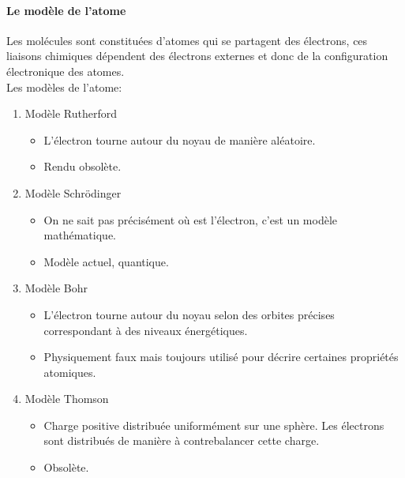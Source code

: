 \documentclass[10pt,a4paper]{book}
\begin{document}
\paragraph{Le modèle de l'atome}
Les molécules sont constituées d'atomes qui se partagent des électrons, ces liaisons chimiques dépendent des électrons externes et donc de la configuration électronique des atomes. \\
Les modèles de l'atome:
\begin{enumerate}
\item Modèle Rutherford
\begin{itemize}
\item L'électron tourne autour du noyau de manière aléatoire.
\item Rendu obsolète.
\end{itemize}
\item Modèle Schrödinger
\begin{itemize}
\item On ne sait pas précisément où est l'électron, c'est un modèle mathématique.
\item Modèle actuel, quantique.
\end{itemize}
\item Modèle Bohr
\begin{itemize}
\item L'électron tourne autour du noyau selon des orbites précises correspondant à des niveaux énergétiques.
\item Physiquement faux mais toujours utilisé pour décrire certaines propriétés atomiques.
\end{itemize}
\item Modèle Thomson
\begin{itemize}
\item Charge positive distribuée uniformément sur une sphère. Les électrons sont distribués de manière à contrebalancer cette charge.
\item Obsolète.
\end{itemize}
\end{enumerate}
\newpage
\end{document}
